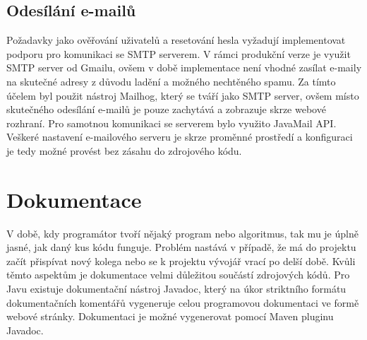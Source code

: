 
\subsection{Odesílání e-mailů}
Požadavky jako ověřování uživatelů a resetování hesla vyžadují implementovat podporu pro komunikaci se SMTP serverem. V rámci produkční verze je využit SMTP server od Gmailu, ovšem v době implementace není vhodné zasílat e-maily na skutečné adresy z důvodu ladění a možného nechtěného spamu. Za tímto účelem byl použit nástroj Mailhog, který se tváří jako SMTP server, ovšem místo skutečného odesílání e-mailů je pouze zachytává a zobrazuje skrze webové rozhraní. Pro samotnou komunikaci se serverem bylo využito JavaMail API. Veškeré nastavení e-mailového serveru je skrze proměnné prostředí a konfiguraci je tedy možné provést bez zásahu do zdrojového kódu.


\section{Dokumentace}
V době, kdy programátor tvoří nějaký program nebo algoritmus, tak mu je úplně jasné, jak daný kus kódu funguje. Problém nastává v případě, že má do projektu začít přispívat nový kolega nebo se k projektu vývojář vrací po delší době. Kvůli těmto aspektům je dokumentace velmi důležitou součástí zdrojových kódů. Pro Javu existuje dokumentační nástroj Javadoc, který na úkor striktního formátu dokumentačních komentářů vygeneruje celou programovou dokumentaci ve formě webové stránky. Dokumentaci je možné vygenerovat pomocí Maven pluginu Javadoc.


